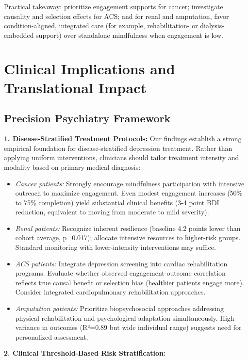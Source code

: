 \documentclass[conference]{IEEEtran}
\begin{document}
Practical takeaway: prioritize engagement supports for cancer; investigate causality and selection effects for ACS; and for renal and amputation, favor condition-aligned, integrated care (for example, rehabilitation- or dialysis-embedded support) over standalone mindfulness when engagement is low.

\section{Clinical Implications and Translational Impact}

\subsection{Precision Psychiatry Framework}

\textbf{1. Disease-Stratified Treatment Protocols:} Our findings establish a strong empirical foundation for disease-stratified depression treatment. Rather than applying uniform interventions, clinicians should tailor treatment intensity and modality based on primary medical diagnosis:
\begin{itemize}
    \item \textit{Cancer patients:} Strongly encourage mindfulness participation with intensive outreach to maximize engagement. Even modest engagement increases (50\% to 75\% completion) yield substantial clinical benefits (3-4 point BDI reduction, equivalent to moving from moderate to mild severity).
    \item \textit{Renal patients:} Recognize inherent resilience (baseline 4.2 points lower than cohort average, p=0.017); allocate intensive resources to higher-risk groups. Standard monitoring with lower-intensity interventions may suffice.
    \item \textit{ACS patients:} Integrate depression screening into cardiac rehabilitation programs. Evaluate whether observed engagement-outcome correlation reflects true causal benefit or selection bias (healthier patients engage more). Consider integrated cardiopulmonary rehabilitation approaches.
    \item \textit{Amputation patients:} Prioritize biopsychosocial approaches addressing physical rehabilitation and psychological adaptation simultaneously. High variance in outcomes (R²=0.89 but wide individual range) suggests need for personalized assessment.
\end{itemize}

\textbf{2. Clinical Threshold-Based Risk Stratification:}
\end{document}
